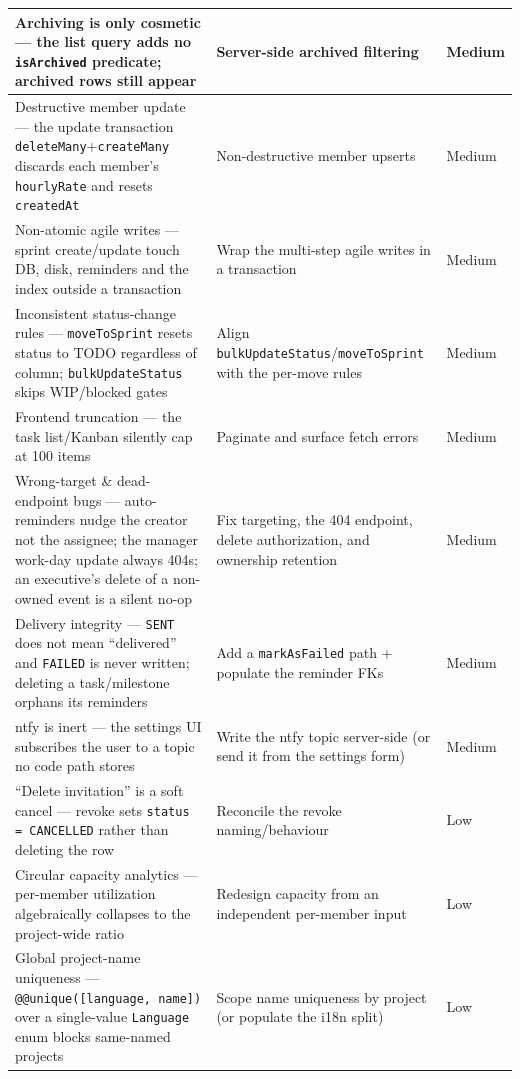 \begin{longtable}{@{}>{\raggedright\arraybackslash}p{6.3cm}>{\raggedright\arraybackslash}p{6.5cm}>{\raggedright\arraybackslash}p{1.4cm}@{}}
\midrule
Archiving is only cosmetic --- the list query adds no \texttt{isArchived} predicate; archived rows still appear & Server-side archived filtering & Medium \\
\midrule
Destructive member update --- the update transaction \texttt{deleteMany}+\texttt{createMany} discards each member's \texttt{hourlyRate} and resets \texttt{createdAt} & Non-destructive member upserts & Medium \\
\midrule
Non-atomic agile writes --- sprint create/update touch DB, disk, reminders and the index outside a transaction & Wrap the multi-step agile writes in a transaction & Medium \\
\midrule
Inconsistent status-change rules --- \texttt{moveToSprint} resets status to TODO regardless of column; \texttt{bulkUpdateStatus} skips WIP/blocked gates & Align \texttt{bulkUpdateStatus}/\texttt{moveToSprint} with the per-move rules & Medium \\
\midrule
Frontend truncation --- the task list/Kanban silently cap at 100 items & Paginate and surface fetch errors & Medium \\
\midrule
Wrong-target \& dead-endpoint bugs --- auto-reminders nudge the creator not the assignee; the manager work-day update always 404s; an executive's delete of a non-owned event is a silent no-op & Fix targeting, the 404 endpoint, delete authorization, and ownership retention & Medium \\
\midrule
Delivery integrity --- \texttt{SENT} does not mean ``delivered'' and \texttt{FAILED} is never written; deleting a task/milestone orphans its reminders & Add a \texttt{markAsFailed} path + populate the reminder FKs & Medium \\
\midrule
ntfy is inert --- the settings UI subscribes the user to a topic no code path stores & Write the ntfy topic server-side (or send it from the settings form) & Medium \\
\midrule
``Delete invitation'' is a soft cancel --- revoke sets \texttt{status = CANCELLED} rather than deleting the row & Reconcile the revoke naming/behaviour & Low \\
\midrule
Circular capacity analytics --- per-member utilization algebraically collapses to the project-wide ratio & Redesign capacity from an independent per-member input & Low \\
\midrule
Global project-name uniqueness --- \texttt{@@unique([language, name])} over a single-value \texttt{Language} enum blocks same-named projects & Scope name uniqueness by project (or populate the i18n split) & Low \\

\end{longtable}
